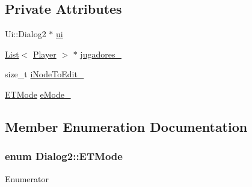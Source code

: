 \subsection*{Private Attributes}
\begin{DoxyCompactItemize}
\item 
Ui\+::\+Dialog2 $\ast$ \hyperlink{class_dialog2_a321aadfcfc152fc97dc63391f08216fa}{ui}
\item 
\hyperlink{class_list}{List}$<$ \hyperlink{class_player}{Player} $>$ $\ast$ \hyperlink{class_dialog2_a1727e93199b6480451889b6522c626a2}{jugadores\+\_\+}
\item 
size\+\_\+t \hyperlink{class_dialog2_a8fb4a8ae79e9aa259a175b61bef0a977}{i\+Node\+To\+Edit\+\_\+}
\item 
\hyperlink{class_dialog2_a8516d2f5d38e3777d9c6a99c3374159a}{E\+T\+Mode} \hyperlink{class_dialog2_a30d760908a70fc65c73499b96c177d46}{e\+Mode\+\_\+}
\end{DoxyCompactItemize}


\subsection{Member Enumeration Documentation}
\hypertarget{class_dialog2_a8516d2f5d38e3777d9c6a99c3374159a}{}
\subsubsection[{E\+T\+Mode}]{\setlength{\rightskip}{0pt plus 5cm}enum {\bf Dialog2\+::\+E\+T\+Mode}}\label{class_dialog2_a8516d2f5d38e3777d9c6a99c3374159a}
\begin{Desc}
\item[Enumerator]\par
\begin{description}
\item[{\em 
\hypertarget{class_dialog2_a8516d2f5d38e3777d9c6a99c3374159aa99ab8d0aab66b8d569f342432fb3054a}{}A\+D\+D\label{class_dialog2_a8516d2f5d38e3777d9c6a99c3374159aa99ab8d0aab66b8d569f342432fb3054a}
}]\item[{\em 
\hypertarget{class_dialog2_a8516d2f5d38e3777d9c6a99c3374159aa6e55cf4ea362da46b174e49f977628d4}{}E\+D\+I\+T\label{class_dialog2_a8516d2f5d38e3777d9c6a99c3374159aa6e55cf4ea362da46b174e49f977628d4}
}]\item[{\em 
\hypertarget{class_dialog2_a8516d2f5d38e3777d9c6a99c3374159aa9e715c7822a53c88692a844d07be7891}{}S\+E\+A\+R\+C\+H\label{class_dialog2_a8516d2f5d38e3777d9c6a99c3374159aa9e715c7822a53c88692a844d07be7891}
}]\end{description}
\end{Desc}


